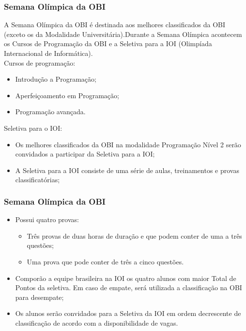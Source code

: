 \begin{frame}
 \frametitle{Semana Olímpica da OBI}
 A Semana Olímpica da OBI é destinada aos melhores classificados da OBI
 (exceto os da Modalidade Universitária).Durante a Semana Olímpica
 acontecem os Cursos de Programação da OBI e a Seletiva para a IOI
 (Olimpíada Internacional de Informática).\\
 
 Cursos de programação:
 \begin{itemize}
  \item Introdução a Programação;
  \item Aperfeiçoamento em Programação;
  \item Programação avançada.
 \end{itemize}
 
 Seletiva para o IOI:
 \begin{itemize}
  \item Os melhores classificados da OBI na modalidade Programação Nível 2
  serão convidados a participar da Seletiva para a IOI;
  \item A Seletiva para a IOI consiste de uma série de aulas,
  treinamentos e provas classificatórias;
 \end{itemize}
\end{frame}

\begin{frame}
 \frametitle{Semana Olímpica da OBI}
 \begin{itemize}
  \item Possui quatro provas:
  \begin{itemize}
   \item Três provas de duas horas de duração e que podem conter de uma a três questões;
   \item Uma prova que pode conter de três a cinco questões.
  \end{itemize}
  \item Comporão a equipe brasileira na IOI os quatro alunos com maior Total de Pontos da seletiva.
  Em caso de empate, será utilizada a classificação na OBI para desempate;
  \item Os alunos serão convidados para a Seletiva da IOI em ordem
  decrescente de classificação de acordo com a disponibilidade de vagas.
  
 \end{itemize}

\end{frame}

